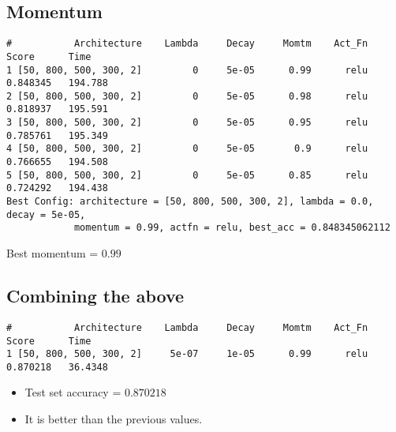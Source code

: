 \documentclass[letter,doc,notimes]{article}
\begin{document}
\subsection{Momentum}
\begin{verbatim}
#           Architecture    Lambda     Decay     Momtm    Act_Fn     Score      Time
1 [50, 800, 500, 300, 2]         0     5e-05      0.99      relu  0.848345   194.788
2 [50, 800, 500, 300, 2]         0     5e-05      0.98      relu  0.818937   195.591
3 [50, 800, 500, 300, 2]         0     5e-05      0.95      relu  0.785761   195.349
4 [50, 800, 500, 300, 2]         0     5e-05       0.9      relu  0.766655   194.508
5 [50, 800, 500, 300, 2]         0     5e-05      0.85      relu  0.724292   194.438
Best Config: architecture = [50, 800, 500, 300, 2], lambda = 0.0, decay = 5e-05,
            momentum = 0.99, actfn = relu, best_acc = 0.848345062112
\end{verbatim}
Best momentum = $0.99$

\subsection{Combining the above}
\begin{verbatim}
#           Architecture    Lambda     Decay     Momtm    Act_Fn     Score      Time
1 [50, 800, 500, 300, 2]     5e-07     1e-05      0.99      relu  0.870218   36.4348
\end{verbatim}
\begin{itemize}
	\item Test set accuracy = $0.870218$
	\item It is better than the previous values.
\end{itemize}
\end{document}
